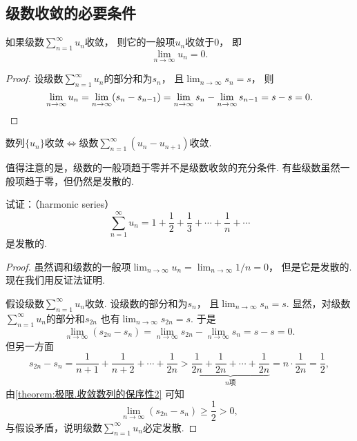 \subsection{级数收敛的必要条件}
\begin{proposition}[级数收敛的必要条件]\label{theorem:无穷级数.级数收敛的必要条件}
如果级数\(\sum_{n=1}^\infty u_n\)收敛，
则它的一般项\(u_n\)收敛于\(0\)，
即\begin{equation*}
	\lim_{n\to\infty} u_n = 0.
\end{equation*}
\begin{proof}
设级数\(\sum_{n=1}^\infty u_n\)的部分和为\(s_n\)，
且\(\lim_{n\to\infty} s_n = s\)，
则\begin{equation*}
	\lim_{n\to\infty} u_n
	= \lim_{n\to\infty}(s_n - s_{n-1})
	= \lim_{n\to\infty} s_n - \lim_{n\to\infty} s_{n-1}
	= s - s
	= 0.
	\qedhere
\end{equation*}
\end{proof}
\end{proposition}
\begin{remark}
数列\(\{u_n\}\)收敛\(\iff\)级数\(\sum_{n=1}^\infty (u_n - u_{n+1})\)收敛.
\end{remark}

值得注意的是，级数的一般项趋于零并不是级数收敛的充分条件.
有些级数虽然一般项趋于零，但仍然是发散的.
\begin{example}\label{example:无穷级数.调和级数的敛散性}
试证：（harmonic series）\begin{equation*}
	\sum_{n=1}^\infty u_n
	= 1+\frac12+\frac13+\dotsb+\frac1n+\dotsb
\end{equation*}是发散的.
\begin{proof}
虽然调和级数的一般项\(\lim_{n\to\infty} u_n
= \lim_{n\to\infty} 1/n
= 0\)，
但是它是发散的.
现在我们用反证法证明.

假设级数\(\sum_{n=1}^\infty u_n\)收敛.
设级数的部分和为\(s_n\)，
且\(\lim_{n\to\infty} s_n
= s\).
显然，对级数\(\sum_{n=1}^\infty u_n\)的部分和\(s_{2n}\)
也有\(\lim_{n\to\infty} s_{2n}
= s\).
于是\begin{equation*}
	\lim_{n\to\infty} (s_{2n}-s_n)
	= \lim_{n\to\infty} s_{2n} - \lim_{n\to\infty} s_n
	= s - s
	= 0.
\end{equation*}
但另一方面\begin{equation*}
	s_{2n} - s_n
	= \frac{1}{n+1}+\frac{1}{n+2}+\dotsb+\frac{1}{2n}
	> \underbrace{\frac{1}{2n}+\frac{1}{2n}+\dotsb+\frac{1}{2n}}_{\text{$n$项}}
	= n \cdot \frac1{2n}
	= \frac12,
\end{equation*}
由\cref{theorem:极限.收敛数列的保序性2} 可知\begin{equation*}
	\lim_{n\to\infty} (s_{2n}-s_n)
	\geq \frac12
	> 0,
\end{equation*}与假设矛盾，说明级数\(\sum_{n=1}^\infty u_n\)必定发散.
\end{proof}
\end{example}

